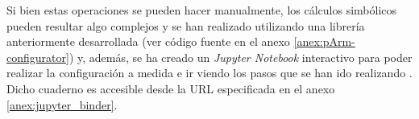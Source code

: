 Si bien estas operaciones se pueden hacer manualmente, los cálculos simbólicos pueden
resultar algo complejos y se han realizado utilizando una librería anteriormente
desarrollada \cite{UPMRoboticsUarm2019b}
(ver código fuente en el anexo \ref{anex:pArm-configurator}) y, además, se ha creado
un \textit{Jupyter Notebook} interactivo para poder realizar la configuración a medida
e ir viendo los pasos que se han ido realizando \cite{PArmTFGPArmconfigurator2020}.
Dicho cuaderno es accesible desde la URL especificada en el anexo \ref{anex:jupyter_binder}.
